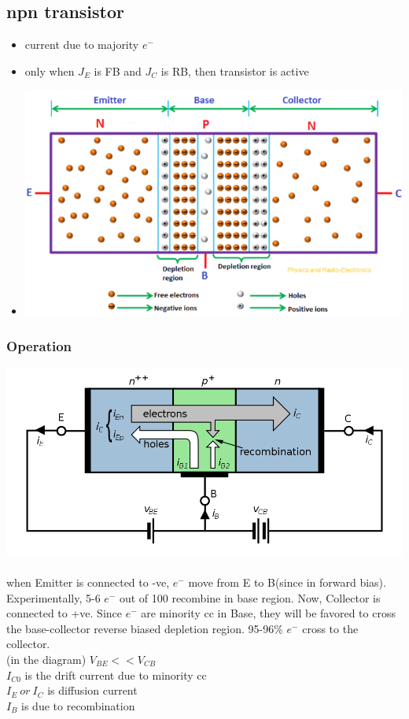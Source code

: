 \documentclass[10pt, a4paper]{report}
\begin{document}
	\subsection{npn transistor}
		\begin{itemize}
			\item current due to majority $ e^- $
			\item only when $ J_E $ is FB and $ J_C $ is RB, then transistor is active
			\item \includegraphics[width=0.8\linewidth]{img/npntransistor}
		\end{itemize}
	\subsubsection{Operation}
	\includegraphics[width=\linewidth]{img/bjt basic op}\\\\
	when Emitter is connected to -ve, $ e^- $ move from E to B(since in forward bias). Experimentally, 5-6 $ e^- $ out of 100 recombine in base region. Now, Collector is connected to +ve. Since $ e^- $ are minority cc in Base, they will be favored to cross the base-collector reverse biased depletion region. 95-96\% $ e^- $ cross to the collector. \\
	(in the diagram) $ V_{BE} << V_{CB} $\\
	$ I_{C0} $ is the drift current due to minority cc\\
	$ I_E \ or\ I_C $ is diffusion current\\
	$ I_B $ is due to recombination
\end{document}
